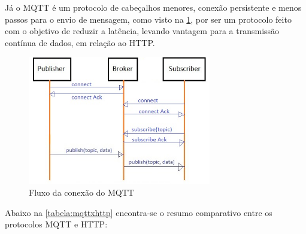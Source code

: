 Já o MQTT é um protocolo de cabeçalhos menores, conexão persistente e menos passos para o envio de mensagem, como visto na \ref{fig:3.2.0/mqtt-flow}, por ser um protocolo feito com o objetivo de reduzir a latência, levando vantagem para a transmissão contínua de dados, em relação ao HTTP.

\begin{figure}[h]
\centering
\includegraphics[width=8cm]{./02_Capitulos/02_Cap3/figures/mqtt-flow}
\caption{Fluxo da conexão do MQTT}
\label{fig:3.2.0/mqtt-flow}
\end{figure}

Abaixo na \ref{tabela:mqttxhttp} encontra-se o resumo comparativo entre os protocolos MQTT e HTTP:

\begin{table}[h!]
\caption{Comparativo MQTT X HTTP}
\label{tabela:mqttxhttp}
\end{table}



